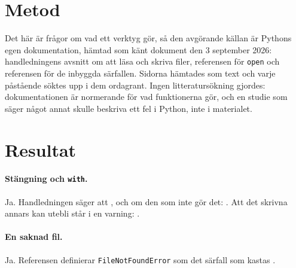 \section{Metod}
\label{sec:dok-metod}

Det här är frågor om vad ett verktyg gör, så den avgörande källan är
Pythons egen dokumentation, hämtad som känt dokument den 3 september
2026: handledningens avsnitt om att läsa och skriva
filer\autocite{PythonTutorialFiles}, referensen för
\texttt{open}\autocite{PythonOpen} och referensen för de
inbyggda särfallen\autocite{PythonExceptions}.  Sidorna hämtades som
text och varje påstående söktes upp i dem ordagrant.  Ingen
litteratursökning gjordes: dokumentationen är normerande för vad
funktionerna gör, och en studie som säger något annat skulle beskriva
ett fel i Python, inte i materialet.


\section{Resultat}
\label{sec:dok-resultat}

\paragraph{Stängning och \texttt{with}.}  Ja.  Handledningen
säger att , och om den som inte gör det:
.  Att det skrivna annars kan utebli står
i en varning: .

\paragraph{En saknad fil.}  Ja.  Referensen definierar
\texttt{FileNotFoundError} som det särfall som kastas
.

